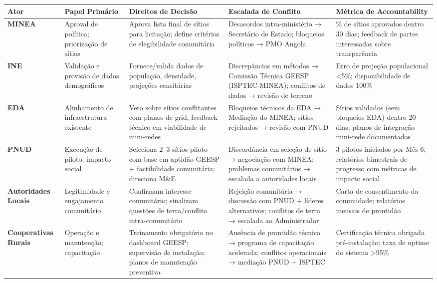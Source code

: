 \documentclass[12pt, a4paper]{article}
\begin{document}
\begin{itemize}
\begin{table}[h!]
\centering
\renewcommand{\arraystretch}{1.35}
\footnotesize
\begin{tabular}{|l|l|l|l|l|}
\hline
\textbf{Ator} & \textbf{Papel Primário} & \textbf{Direitos de Decisão} & \textbf{Escalada de Conflito} & \textbf{Métrica de Accountability} \\
\hline
\textbf{MINEA} & Aproval de política; priorização de sítios & Aprova lista final de sítios para licitação; define critérios de elegibilidade comunitária & Desacordos intra-ministério → Secretário de Estado; bloqueios políticos → PMO Angola & \% de sítios aprovados dentro 30 dias; feedback de partes interessadas sobre transparência \\
\hline
\textbf{INE} & Validação e provisão de dados demográficos & Fornece/valida dados de população, densidade, projeções censitárias & Discrepâncias em métodos → Comissão Técnica GEESP (ISPTEC-MINEA); conflitos de dados → revisão de terreno & Erro de projeção populacional <5\%; disponibilidade de dados 100\% \\
\hline
\textbf{EDA} & Alinhamento de infraestrutura existente & Veto sobre sítios conflitantes com planos de grid; feedback técnico em viabilidade de mini-redes & Bloqueios técnicos da EDA → Mediação do MINEA; sítios rejeitados → revisão com PNUD & Sítios validados (sem bloqueios EDA) dentro 20 dias; planos de integração mini-rede documentados \\
\hline
\textbf{PNUD} & Execução de piloto; impacto social & Seleciona 2--3 sítios piloto com base em aptidão GEESP + factibilidade comunitária; direciona M\&E & Discordância em seleção de sítio → negociação com MINEA; problemas comunitários → escalada a autoridades locais & 3 pilotos iniciados por Mês 6; relatórios bimestrais de progresso com métricas de impacto social \\
\hline
\textbf{Autoridades Locais} & Legitimidade e engajamento comunitário & Confirmam interesse comunitário; sinalizam questões de terra/conflito intra-comunitário & Rejeição comunitária → discussão com PNUD + líderes alternativos; conflitos de terra → escalada ao Administrador & Carta de consentimento da comunidade; relatórios mensais de prontidão \\
\hline
\textbf{Cooperativas Rurais} & Operação e manutenção; capacitação & Treinamento obrigatório no dashboard GEESP; supervisão de instalação; planos de manutenção preventiva & Ausência de prontidão técnica → programa de capacitação acelerada; conflitos operacionais → mediação PNUD + ISPTEC & Certificação técnica obrigada pré-instalação; taxa de uptime do sistema >95\% \\

\end{tabular}
\end{table}
\end{itemize}
\end{document}
